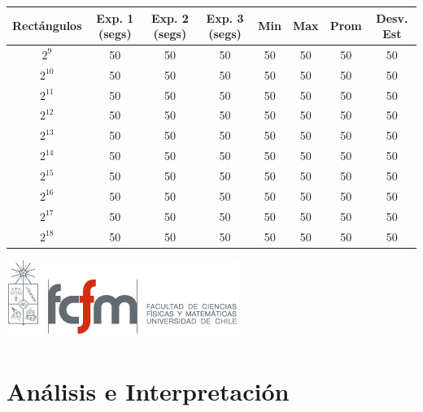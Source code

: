 \documentclass[letterpaper,10pt]{article}
\begin{document}
	\begin{center}

		\begin{tabular}{|c|c|c|c|c|c|c|c|}
			\hline
			Rectángulos	& Exp. 1 (segs) & Exp. 2 (segs) & Exp. 3 (segs) & Min & Max & Prom & Desv. Est\\
			\hline
			$2^{9}$ 	& 50 	& 50 	& 50 	& 50 	& 50 	& 50 	& 50 \\
			\hline
			$2^{10}$ 	& 50 	& 50 	& 50 	& 50 	& 50 	& 50 	& 50 \\
			\hline
			$2^{11}$ 	& 50 	& 50 	& 50 	& 50 	& 50 	& 50 	& 50 \\
			\hline
			$2^{12}$ 	& 50 	& 50 	& 50 	& 50 	& 50 	& 50 	& 50 \\
			\hline
			$2^{13}$ 	& 50 	& 50 	& 50 	& 50 	& 50 	& 50 	& 50 \\
			\hline
			$2^{14}$ 	& 50 	& 50 	& 50 	& 50 	& 50 	& 50 	& 50 \\
			\hline
			$2^{15}$ 	& 50 	& 50 	& 50 	& 50 	& 50 	& 50 	& 50 \\
			\hline
			$2^{16}$ 	& 50 	& 50 	& 50 	& 50 	& 50 	& 50 	& 50 \\
			\hline
			$2^{17}$ 	& 50 	& 50 	& 50 	& 50 	& 50 	& 50 	& 50 \\
			\hline
			$2^{18}$ 	& 50 	& 50 	& 50 	& 50 	& 50 	& 50 	& 50 \\
			\hline
		\end{tabular}

		\includegraphics{logoFCFM.png}
	\end{center}

	\newpage

	\section{Análisis e Interpretación}
\end{document}
